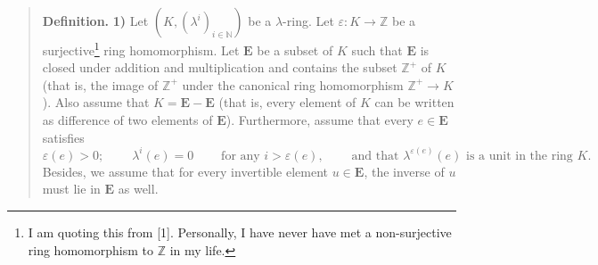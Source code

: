 \documentclass[numbers=enddot,12pt,final,onecolumn,notitlepage]{scrartcl}%
\begin{document}
\begin{quote}
\textbf{Definition.} \textbf{1)} Let $\left(  K,\left(  \lambda^{i}\right)
_{i\in\mathbb{N}}\right)  $ be a $\lambda$-ring. Let $\varepsilon
:K\rightarrow\mathbb{Z}$ be a surjective\footnote{I am quoting this from [1].
Personally, I have never have met a non-surjective ring homomorphism to
$\mathbb{Z}$ in my life.} ring homomorphism. Let $\mathbf{E}$ be a subset of
$K$ such that $\mathbf{E}$ is closed under addition and multiplication and
contains the subset $\mathbb{Z}^{+}$ of $K$ (that is, the image of
$\mathbb{Z}^{+}$ under the canonical ring homomorphism $\mathbb{Z}%
^{+}\rightarrow K$). Also assume that $K=\mathbf{E}-\mathbf{E}$ (that is,
every element of $K$ can be written as difference of two elements of
$\mathbf{E}$). Furthermore, assume that every $e\in\mathbf{E}$ satisfies%
\[
\varepsilon\left(  e\right)  >0;\ \ \ \ \ \ \ \ \ \ \lambda^{i}\left(
e\right)  =0\ \ \ \ \ \ \ \ \ \ \text{for any }i>\varepsilon\left(  e\right)
,\ \ \ \ \ \ \ \ \ \ \text{and that }\lambda^{\varepsilon\left(  e\right)
}\left(  e\right)  \text{ is a unit in the ring }K.
\]
Besides, we assume that for every invertible element $u\in\mathbf{E}$, the
inverse of $u$ must lie in $\mathbf{E}$ as well.


\end{quote}
\end{document}
